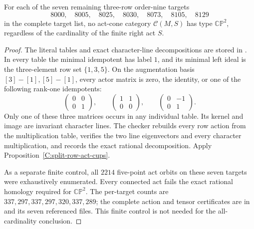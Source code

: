 \begin{proposition}\label{C:nine-three-row-all-acts}
For each of the seven remaining three-row order-nine targets
\[
8000,\quad8005,\quad8025,\quad8030,\quad8073,\quad8105,\quad8129
\]
in the complete target list,
no act-cone category $\mathcal C(M,S)$ has type $\mathbb{CP}^2$,
regardless of the cardinality of the finite right act $S$.
\end{proposition}

\begin{proof}
The literal tables and exact character-line decompositions are stored
in .  In every table
the minimal idempotent has label $1$, and its minimal left ideal is
the three-element row set $\{1,3,5\}$.  On the augmentation basis
$[3]-[1],[5]-[1]$, every actor matrix is zero, the identity, or one
of the following rank-one idempotents:
\[
 \begin{pmatrix}0&0\\0&1\end{pmatrix},\qquad
 \begin{pmatrix}1&1\\0&0\end{pmatrix},\qquad
 \begin{pmatrix}0&-1\\0&1\end{pmatrix}.
\]
Only one of these three matrices occurs in any individual table.
Its kernel and image are invariant character lines.  The checker
rebuilds every row action from the multiplication table, verifies
the two line eigenvectors and every character multiplication, and
records the exact rational decomposition.  Apply
Proposition~\ref{C:split-row-act-cups}.

As a separate finite control, all $2214$ five-point act orbits on
these seven targets were exhaustively enumerated.  Every connected
act fails the exact rational homology required for $\mathbb{CP}^2$.
The per-target counts are $337,297,337,297,320,337,289$; the complete
action and tensor certificates are in
 and its seven
referenced files.  This finite control is not needed for the
all-cardinality conclusion.
\end{proof}
